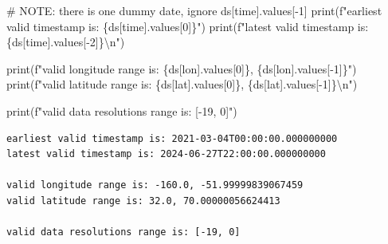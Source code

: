 \documentclass[
  letterpaper,
  DIV=11,
  numbers=noendperiod]{scrreprt}
\newenvironment{Shaded}{\begin{snugshade}}{\end{snugshade}}
\newcommand{\AlertTok}[1]{\textcolor[rgb]{0.68,0.00,0.00}{#1}}
\newcommand{\BuiltInTok}[1]{\textcolor[rgb]{0.00,0.23,0.31}{#1}}
\newcommand{\CharTok}[1]{\textcolor[rgb]{0.13,0.47,0.30}{#1}}
\newcommand{\CommentTok}[1]{\textcolor[rgb]{0.37,0.37,0.37}{#1}}
\newcommand{\DecValTok}[1]{\textcolor[rgb]{0.68,0.00,0.00}{#1}}
\newcommand{\NormalTok}[1]{\textcolor[rgb]{0.00,0.23,0.31}{#1}}
\newcommand{\OperatorTok}[1]{\textcolor[rgb]{0.37,0.37,0.37}{#1}}
\newcommand{\SpecialCharTok}[1]{\textcolor[rgb]{0.37,0.37,0.37}{#1}}
\newcommand{\SpecialStringTok}[1]{\textcolor[rgb]{0.13,0.47,0.30}{#1}}
\newcommand{\StringTok}[1]{\textcolor[rgb]{0.13,0.47,0.30}{#1}}
\begin{document}
\begin{Shaded}
\begin{Highlighting}[]
\CommentTok{\# }\AlertTok{NOTE}\CommentTok{: there is one dummy date, ignore ds[\textquotesingle{}time\textquotesingle{}].values[{-}1]}
\BuiltInTok{print}\NormalTok{(}\SpecialStringTok{f"earliest valid timestamp is: }\SpecialCharTok{\{}\NormalTok{ds[}\StringTok{\textquotesingle{}time\textquotesingle{}}\NormalTok{]}\SpecialCharTok{.}\NormalTok{values[}\DecValTok{0}\NormalTok{]}\SpecialCharTok{\}}\SpecialStringTok{"}\NormalTok{)}
\BuiltInTok{print}\NormalTok{(}\SpecialStringTok{f"latest valid timestamp is: }\SpecialCharTok{\{}\NormalTok{ds[}\StringTok{\textquotesingle{}time\textquotesingle{}}\NormalTok{]}\SpecialCharTok{.}\NormalTok{values[}\OperatorTok{{-}}\DecValTok{2}\NormalTok{]}\SpecialCharTok{\}}\CharTok{\textbackslash{}n}\SpecialStringTok{"}\NormalTok{)}

\BuiltInTok{print}\NormalTok{(}\SpecialStringTok{f"valid longitude range is: }\SpecialCharTok{\{}\NormalTok{ds[}\StringTok{\textquotesingle{}lon\textquotesingle{}}\NormalTok{]}\SpecialCharTok{.}\NormalTok{values[}\DecValTok{0}\NormalTok{]}\SpecialCharTok{\}}\SpecialStringTok{, }\SpecialCharTok{\{}\NormalTok{ds[}\StringTok{\textquotesingle{}lon\textquotesingle{}}\NormalTok{]}\SpecialCharTok{.}\NormalTok{values[}\OperatorTok{{-}}\DecValTok{1}\NormalTok{]}\SpecialCharTok{\}}\SpecialStringTok{"}\NormalTok{)}
\BuiltInTok{print}\NormalTok{(}\SpecialStringTok{f"valid latitude range is: }\SpecialCharTok{\{}\NormalTok{ds[}\StringTok{\textquotesingle{}lat\textquotesingle{}}\NormalTok{]}\SpecialCharTok{.}\NormalTok{values[}\DecValTok{0}\NormalTok{]}\SpecialCharTok{\}}\SpecialStringTok{, }\SpecialCharTok{\{}\NormalTok{ds[}\StringTok{\textquotesingle{}lat\textquotesingle{}}\NormalTok{]}\SpecialCharTok{.}\NormalTok{values[}\OperatorTok{{-}}\DecValTok{1}\NormalTok{]}\SpecialCharTok{\}}\CharTok{\textbackslash{}n}\SpecialStringTok{"}\NormalTok{)}

\BuiltInTok{print}\NormalTok{(}\SpecialStringTok{f"valid data resolutions range is: [{-}19, 0]"}\NormalTok{)}
\end{Highlighting}
\end{Shaded}

\begin{verbatim}
earliest valid timestamp is: 2021-03-04T00:00:00.000000000
latest valid timestamp is: 2024-06-27T22:00:00.000000000

valid longitude range is: -160.0, -51.99999839067459
valid latitude range is: 32.0, 70.00000056624413

valid data resolutions range is: [-19, 0]
\end{verbatim}
\end{document}
